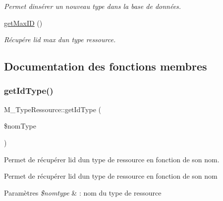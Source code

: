 \begin{DoxyCompactItemize}
\begin{DoxyCompactList}\small\item\em Permet d\textquotesingle{}insérer un nouveau type dans la base de données. \end{DoxyCompactList}\item 
\hyperlink{class_m___type_ressource_ac1cfaa23129b68f071f8335455e13d41}{get\+Max\+ID} ()
\begin{DoxyCompactList}\small\item\em Récupére l\textquotesingle{}id max d\textquotesingle{}un type ressource. \end{DoxyCompactList}\end{DoxyCompactItemize}


\subsection{Documentation des fonctions membres}
\mbox{\label{class_m___type_ressource_a2b7dcf76241f926cc5f2d91bc4f4e6a1}} 
\subsubsection{\texorpdfstring{get\+Id\+Type()}{getIdType()}}
{\footnotesize\ttfamily M\+\_\+\+Type\+Ressource\+::get\+Id\+Type (\begin{DoxyParamCaption}\item[{}]{\$nom\+Type }\end{DoxyParamCaption})}



Permet de récupérer l\textquotesingle{}id d\textquotesingle{}un type de ressource en fonction de son nom. 

Permet de récupérer l\textquotesingle{}id d\textquotesingle{}un type de ressource en fonction de son nom 
\begin{DoxyParams}{Paramètres}
{\em \$nomtype} & \+: nom du type de ressource \\
\hline
\end{DoxyParams}
\mbox{\label{class_m___type_ressource_ac1cfaa23129b68f071f8335455e13d41}} 
